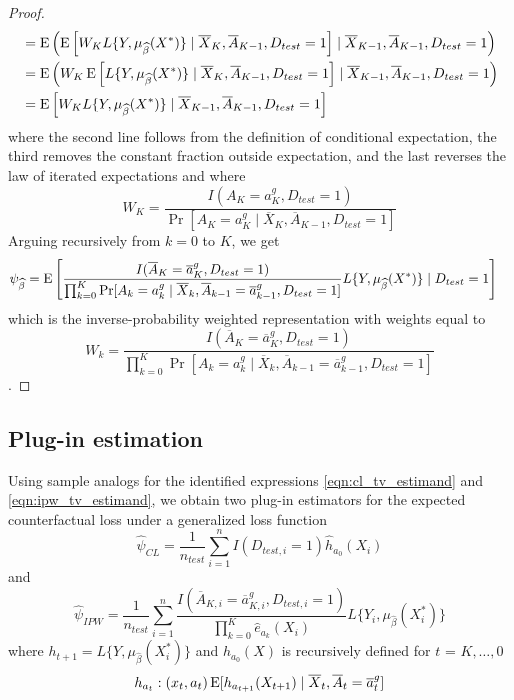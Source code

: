 \begin{proof}
\begin{align*}
        &= \operatorname{E}\left(\operatorname{E}\left[W_K L\{Y, \mu_{\widehat{\beta}}(X^*)\} \mid \overline{X}_K, \overline{A}_{K-1}, D_{test} = 1\right] \mid \overline{X}_{K-1}, \overline{A}_{K-1}, D_{test} = 1\right)\\
        &= \operatorname{E}\left(W_K \operatorname{E}\left[L\{Y, \mu_{\widehat{\beta}}(X^*)\} \mid \overline{X}_K, \overline{A}_{K-1}, D_{test} = 1\right] \mid \overline{X}_{K-1}, \overline{A}_{K-1}, D_{test} = 1\right)\\
        &= \operatorname{E}\left[W_K L\{Y, \mu_{\widehat{\beta}}(X^*)\} \mid \overline{X}_{K-1}, \overline{A}_{K-1}, D_{test} = 1\right]
    \end{align*}
    where the second line follows from the definition of conditional expectation, the third removes the constant fraction outside expectation, and the last reverses the law of iterated expectations and where 
    $$W_K = \frac{I(A_K = a_K^g, D_{test} = 1)}{\Pr[A_K = a_K^g \mid \overline{X}_K, \overline{A}_{K-1}, D_{test} = 1]}$$
    Arguing recursively from $k = 0$ to $K$, we get
    \begin{align*}
        \psi_{\widehat{\beta}} &= \operatorname{E}\left[\frac{I(\overline{A}_K = \overline{a}^g_K, D_{test} = 1)}{\prod_{k=0}^K\Pr[A_k = a^g_k \mid \overline{X}_k, \overline{A}_{k-1} = \overline{a}^g_{k-1}, D_{test} = 1]}L\{Y, \mu_{\widehat{\beta}}(X^*)\} \mid D_{test} = 1\right] 
    \end{align*}
    which is the inverse-probability weighted representation with weights equal to 
    $$W_k = \frac{I(\overline{A}_K = \overline{a}^g_K, D_{test} = 1)}{\prod_{k=0}^K\Pr[A_k = a^g_k \mid \overline{X}_k, \overline{A}_{k-1} = \overline{a}^g_{k-1}, D_{test} = 1]}$$
    .
\end{proof}

\subsection{Plug-in estimation}

Using sample analogs for the identified expressions \ref{eqn:cl_tv_estimand} and \ref{eqn:ipw_tv_estimand}, we obtain two plug-in estimators for the expected counterfactual loss under a generalized loss function
\begin{equation*}
    \widehat{\psi}_{CL} = \frac{1}{n_{test}}\sum_{i=1}^nI(D_{test, i} = 1)\widehat{h}_{a_0}(X_i)
\end{equation*}
and 
\begin{equation*}
    \widehat{\psi}_{IPW} = \frac{1}{n_{test}}\sum_{i=1}^n \frac{I(\overline{A}_{K,i} = \overline{a}^g_{K,i}, D_{test,i} = 1)}{\prod_{k=0}^K \widehat{e}_{a_k}(X_i)} L\{Y_i, \mu_{\widehat{\beta}}(X^*_i)\}
\end{equation*}
where $h_{t+1} = L\{Y, \mu_{\widehat{\beta}}(X^*_i)\}$ and $h_{a_0}(X)$ is recursively defined for $t$ = $K, \ldots, 0$
\[h_{a_t} : (x_t, a_t) \operatorname{E}[ h_{a_{t+1}}(X_{t+1}) \mid \overline{X}_t, \overline{A}_t = \overline{a}^g_t]\]

